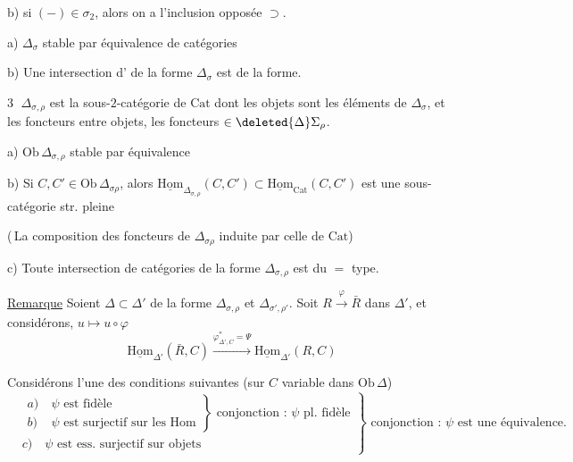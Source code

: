 b) si $(-)\in\sigma_2$, alors on a l'inclusion opposée $\supset$.

a) $\Delta_\sigma$ stable par équivalence de catégories

b) Une intersection d' de la forme $\Delta_\sigma$ est de la  forme.

\textcircled{3} $\Delta_{\sigma,\rho}$ est la  sous-$2$-catégorie de $\mathrm{Cat}$ dont les objets sont les éléments de $\Delta_\sigma$, et les foncteurs entre  objets, les foncteurs $\in\deleted{\Delta}\Sigma_\rho$.

a) $\mathrm{Ob}\,\Delta_{\sigma,\rho}$ stable par équivalence

b) Si $C,C'\in\mathrm{Ob}\,\Delta_{\sigma\rho}$, alors $\underline{\mathrm{Hom}}_{\Delta_{\sigma,\rho}}(C,C')\subset\underline{\mathrm{Hom}}_{\mathrm{Cat}}(C,C')$ est une sous-catégorie str. pleine 

(\,La composition des foncteurs de $\Delta_{\sigma\rho}$ induite par celle de $\mathrm{Cat}$)

c) Toute intersection de catégories de la forme $\Delta_{\sigma,\rho}$ est du $=$ type.


\uline{Remarque} Soient $\Delta\subset\Delta'$ de la forme $\Delta_{\sigma,\rho}$ et $\Delta_{\sigma',\rho'}$. Soit $R\xrightarrow{\varphi}\bar R$ dans $\Delta'$, et considérons,  $u\longmapsto u\circ\varphi$
\[
\underline{\mathrm{Hom}}_{\Delta'}(\bar R,C)\xrightarrow{\varphi^*_{\Delta',C}=\Psi}\underline{\mathrm{Hom}}_{\Delta'}(R,C)
\]

Considérons l'une des conditions suivantes (sur $C$ variable dans $\mathrm{Ob}\,\Delta$)
\[
\left.\begin{aligned}
&\left.\begin{aligned}a)&\ \psi\text{ est fidèle}\\ b)&\ \psi\text{ est surjectif sur les Hom}\end{aligned}\right\}
\text{ conjonction : }\psi\text{ pl. fidèle}\\
&c)\quad\psi\text{ est ess. surjectif sur objets}
\end{aligned}\right\}\text{ conjonction : }\psi\text{ est une équivalence.}
\]

